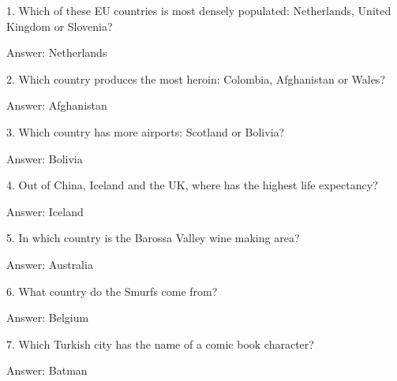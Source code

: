 \documentclass{beamer}
\begin{document}
    \begin{frame}
        1. Which of these EU countries is most densely populated: Netherlands,
        United Kingdom or Slovenia?

        Answer: Netherlands
    \end{frame}

    \begin{frame}
        2. Which country produces the most heroin: Colombia, Afghanistan or
        Wales?

        Answer: Afghanistan
    \end{frame}

    \begin{frame}
        3. Which country has more airports: Scotland or Bolivia?

        Answer: Bolivia
    \end{frame}

    \begin{frame}
        4. Out of China, Iceland and the UK, where has the highest life
        expectancy?

        Answer: Iceland
    \end{frame}

    \begin{frame}
        5. In which country is the Barossa Valley wine making area?

        Answer: Australia
    \end{frame}

    \begin{frame}
        6. What country do the Smurfs come from?

        Answer: Belgium
    \end{frame}

    \begin{frame}
        7. Which Turkish city has the name of a comic book character?

        Answer: Batman
    \end{frame}

\end{document}
